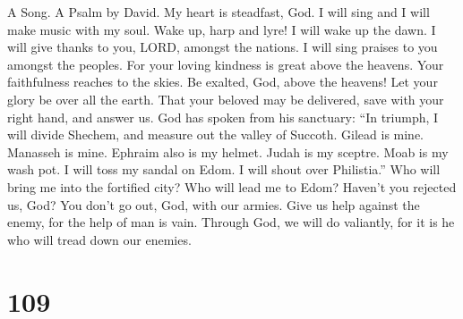 A Song. A Psalm by David.  My heart is steadfast, God. I
will sing and I will make music with my soul.  Wake up,
harp and lyre! I will wake up the dawn.  I will give
thanks to you, LORD, amongst the nations. I will sing praises to you
amongst the peoples.  For your loving kindness is great
above the heavens. Your faithfulness reaches to the skies.
 Be exalted, God, above the heavens! Let your glory be
over all the earth.  That your beloved may be delivered,
save with your right hand, and answer us.  God has spoken
from his sanctuary: ``In triumph, I will divide Shechem, and measure out
the valley of Succoth.  Gilead is mine. Manasseh is mine.
Ephraim also is my helmet. Judah is my sceptre.  Moab is
my wash pot. I will toss my sandal on Edom. I will shout over
Philistia.''  Who will bring me into the fortified city?
Who will lead me to Edom?  Haven't you rejected us, God?
You don't go out, God, with our armies.  Give us help
against the enemy, for the help of man is vain.  Through
God, we will do valiantly, for it is he who will tread down our enemies.

\hypertarget{section-101}{%
\section{109}\label{section-101}}


